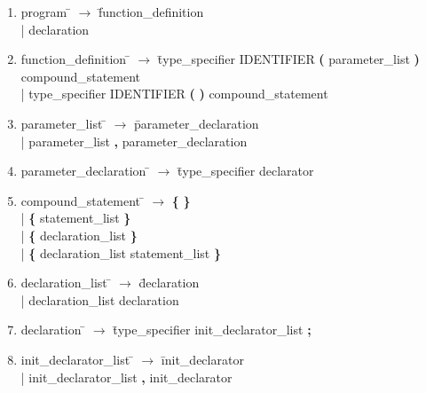 \documentclass[12pt]{article}
\begin{document}
\small
\begin{enumerate}
\item \begin{tabbing} program \= $\to$ \= function{\_}definition \\
	\> | \> declaration
\end{tabbing}

\item \begin{tabbing} function{\_}definition \= $\to$ \= type{\_}specifier IDENTIFIER \textbf{(} parameter{\_}list \textbf{)} compound{\_}statement \\
	\> | \> type{\_}specifier IDENTIFIER \textbf{(} \textbf{)} compound{\_}statement
\end{tabbing}

\item \begin{tabbing} parameter{\_}list \= $\to$ \= parameter{\_}declaration \\
	\> | \> parameter{\_}list \textbf{,} parameter{\_}declaration
\end{tabbing}

\item \begin{tabbing} parameter{\_}declaration \= $\to$ \= type{\_}specifier declarator
\end{tabbing}

\item \begin{tabbing} compound{\_}statement \= $\to$ \= \textbf{\{} \textbf{\}} \\
	\> | \> \textbf{\{} statement{\_}list \textbf{\}} \\
	\> | \> \textbf{\{} declaration{\_}list \textbf{\}} \\
	\> | \> \textbf{\{} declaration{\_}list statement{\_}list \textbf{\}}
\end{tabbing}

\item \begin{tabbing} declaration{\_}list \= $\to$ \= declaration \\
	\> | \> declaration{\_}list declaration
\end{tabbing}

\item \begin{tabbing} declaration \= $\to$ \= type{\_}specifier init{\_}declarator{\_}list \textbf{;}
\end{tabbing}

\item \begin{tabbing} init{\_}declarator{\_}list \= $\to$ \= init{\_}declarator \\
	\> | \> init{\_}declarator{\_}list \textbf{,} init{\_}declarator
\end{tabbing}


\end{enumerate}
\end{document}
